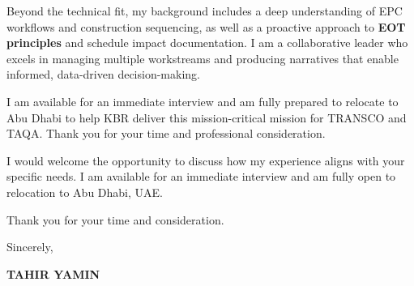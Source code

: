 \documentclass[11pt,a4paper]{article}
\begin{document}
Beyond the technical fit, my background includes a deep understanding of EPC workflows and construction sequencing, as well as a proactive approach to \textbf{EOT principles} and schedule impact documentation. I am a collaborative leader who excels in managing multiple workstreams and producing narratives that enable informed, data-driven decision-making.

I am available for an immediate interview and am fully prepared to relocate to Abu Dhabi to help KBR deliver this mission-critical mission for TRANSCO and TAQA. Thank you for your time and professional consideration.

I would welcome the opportunity to discuss how my experience aligns with your specific needs. I am available for an immediate interview and am fully open to relocation to Abu Dhabi, UAE.

Thank you for your time and consideration.

\vspace{0.5cm}
Sincerely,

\vspace{0.5cm}
\textbf{TAHIR YAMIN}
\end{document}

